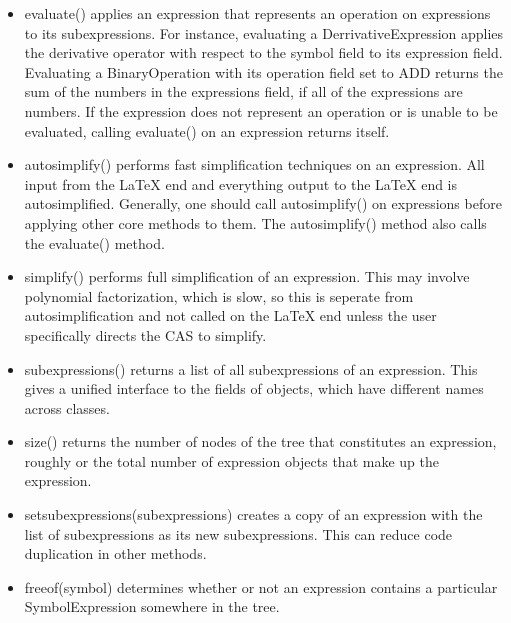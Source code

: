 \documentclass{article}
\begin{document}
\begin{itemize}
    \item {\ttfamily evaluate()} applies an expression that represents an operation on expressions to its subexpressions. For instance, evaluating a {\ttfamily DerrivativeExpression} applies the derivative operator with respect to the {\ttfamily symbol} field to its {\ttfamily expression} field. Evaluating a {\ttfamily BinaryOperation} with its {\ttfamily operation} field set to {\ttfamily ADD} returns the sum of the numbers in the {\ttfamily expressions} field, if all of the expressions are numbers. If the expression does not represent an operation or is unable to be evaluated, calling {\ttfamily evaluate()} on an expression returns itself.
    
    \item {\ttfamily autosimplify()} performs fast simplification techniques on an expression. All input from the \LaTeX{} end and everything output to the \LaTeX{} end is autosimplified. Generally, one should call {\ttfamily autosimplify()} on expressions before applying other core methods to them. The {\ttfamily autosimplify()} method also calls the {\ttfamily evaluate()} method.
    
    \item {\ttfamily simplify()} performs full simplification of an expression. This may involve polynomial factorization, which is slow, so this is seperate from autosimplification and not called on the \LaTeX{} end unless the user specifically directs the CAS to simplify.
    
    \item {\ttfamily subexpressions()} returns a list of all subexpressions of an expression. This gives a unified interface to the fields of objects, which have different names across classes.
    
    \item {\ttfamily size()} returns the number of nodes of the tree that constitutes an expression, roughly or the total number of expression objects that make up the expression.
    
    \item {\ttfamily setsubexpressions(subexpressions)} creates a copy of an expression with the list of subexpressions as its new subexpressions. This can reduce code duplication in other methods.
    
    \item {\ttfamily freeof(symbol)} determines whether or not an expression contains a particular \\ {\ttfamily SymbolExpression} somewhere in the tree.
    

\end{itemize}
\end{document}
